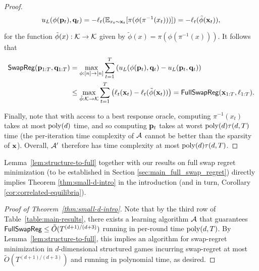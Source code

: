 \documentclass[final,12pt]{alt2025}
\begin{document}
\begin{proof}
$$u_L(\phi(\mathbf{p}_t), \mathbf{q}_t) = -\ell_t(\mathbb{E}_{x_t \sim \mathbf{x}_t}[\pi(\phi(\pi^{-1}(x_t)))]) = -\ell_t(\tilde{\phi}(\mathbf{x}_t)),$$

\noindent
for the function $\tilde{\phi}(x): \mathcal{K} \rightarrow \mathcal{K}$ given by $\tilde{\phi}(x) = \pi(\phi(\pi^{-1}(x)))$. It follows that
\begin{align*}
\operatorname{\mathsf{SwapReg}}(\mathbf{p}_{1:T}, \mathbf{q}_{1:T}) &= \max_{\phi: [n] \rightarrow [n]} \sum_{t=1}^{T}\left(u_L(\phi(\mathbf{p}_t), \mathbf{q}_t) - u_L(\mathbf{p}_t, \mathbf{q}_t)\right)\\
&\leq \max_{\tilde{\phi}:\mathcal{K}\rightarrow \mathcal{K}}\sum_{t=1}^{T} \left(\ell_t(\mathbf{x}_t) - \ell_t(\tilde{\phi}(\mathbf{x}_t))\right) = \mathsf{FullSwapReg}(\mathbf{x}_{1:T}, \ell_{1:T}).
\end{align*}

Finally, note that with access to a best response oracle, computing $\pi^{-1}(x_t)$ takes at most $\operatorname{poly}(d)$ time, and so computing $\mathbf{p}_t$ takes at worst $\operatorname{poly}(d)\tau(d, T)$ time (the per-iteration time complexity of $\mathcal{A}$ cannot be better than the sparsity of $\mathbf{x}$). Overall, $\mathcal{A}'$ therefore has time complexity at most $\operatorname{poly}(d)\tau(d, T)$.
\end{proof}

Lemma~\ref{lem:structure-to-full} together with our results on full swap regret minimization (to be established in Section \ref{sec:main_full_swap_regret}) directly implies Theorem \ref{thm:small-d-intro} in the introduction (and in turn, Corollary \ref{cor:correlated-equilibria}). 

\begin{proof}[Proof of Theorem~\ref{thm:small-d-intro}]
Note that by the third row of Table~\ref{table:main-results}, there exists a learning algorithm $\mathcal{A}$ that guarantees $\mathsf{FullSwapReg} \leq \tilde{O}(T^{(d+1)/(d+3)})$ running in per-round time $\operatorname{poly}(d, T)$. By Lemma~\ref{lem:structure-to-full}, this implies an algorithm for swap-regret minimization in $d$-dimensional structured games incurring swap-regret at most $\tilde{O}(T^{(d+1)/(d+3)})$ and running in polynomial time, as desired.
\end{proof}
\end{document}
